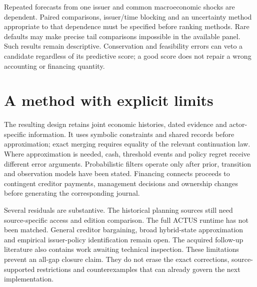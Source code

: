 \documentclass[11pt,a4paper]{article}
\begin{document}
Repeated forecasts from one issuer and common macroeconomic shocks are
dependent. Paired comparisons, issuer/time blocking and an uncertainty method
appropriate to that dependence must be specified before ranking methods.
Rare defaults may make precise tail comparisons impossible in the available
panel. Such results remain descriptive. Conservation and feasibility errors
can veto a candidate regardless of its predictive score; a good score does
not repair a wrong accounting or financing quantity.

\section{A method with explicit limits}
The resulting design retains joint economic histories, dated evidence and
actor-specific information. It uses symbolic constraints and shared records
before approximation; exact merging requires equality of the relevant
continuation law. Where approximation is needed, cash, threshold events and
policy regret receive different error arguments. Probabilistic filters operate
only after prior, transition and observation models have been stated.
Financing connects proceeds to contingent creditor payments, management
decisions and ownership changes before generating the corresponding journal.

Several residuals are substantive. The historical planning sources still
need source-specific access and edition comparison. The full ACTUS runtime
has not been matched. General creditor bargaining, broad hybrid-state
approximation and empirical issuer-policy identification remain open.
The acquired follow-up literature also contains work awaiting technical
inspection. These limitations prevent an all-gap closure claim. They do not
erase the exact corrections, source-supported restrictions and counterexamples
that can already govern the next implementation.
\end{document}
